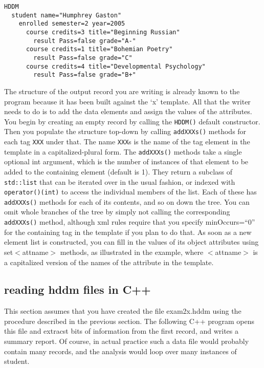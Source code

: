 \documentclass{revtex4}
\begin{document}
\vspace{0.5cm}
\begin{minipage}{12cm}
\begin{verbatim}
HDDM
  student name="Humphrey Gaston"
    enrolled semester=2 year=2005
      course credits=3 title="Beginning Russian"
        result Pass=false grade="A-"
      course credits=1 title="Bohemian Poetry"
        result Pass=false grade="C"
      course credits=4 title="Developmental Psychology"
        result Pass=false grade="B+"
\end{verbatim}
\end{minipage}
\vspace{0.5cm}

The structure of the output record you are writing is already known to
the program because it has been built against the `x' template. All that
the writer needs to do is to add the data elements and assign the values of
the attributes. You begin by creating an empty record by calling the 
\texttt{HDDM()} default constructor. Then you populate the structure
top-{}down by calling \texttt{addXXXs()} methods for each tag \texttt{XXX}
under that. The name \texttt{XXX}s is the name of the tag element in the
template in a capitalized-{}plural form. The \texttt{addXXXs()} methods
take a single optional int argument, which is the number of instances of
that element to be added to the containing element (default is 1). They
return a subclass of \texttt{std::list} that can be iterated over in the
usual fashion, or indexed with \texttt{operator()(int)} to access the
individual members of the list. Each of these has \texttt{addXXXs()}
methods for each of its contents, and so on down the tree. You can omit
whole branches of the tree by simply not calling the corresponding
\texttt{addXXXs()} method, although xml rules require that you specify
minOccurs=``0'' for the containing tag in the template if you plan to do
that. As soon as a new element list is constructed, you can fill in the
values of its object attributes using set{\mbox{$<$}}attname{\mbox{$>$}}
methods, as illustrated in the example, where {\mbox{$<$}}attname{\mbox{$>$}}
is a capitalized version of the names of the attribute in the template.

\subsection{reading hddm files in C++}

This section assumes that you have created the file exam2x.hddm using the
procedure described in the previous section. The following C++ program 
opens this file and extracst bits of information from the first record,
and writes a summary report. Of course, in actual practice such a data
file would probably contain many records, and the analysis would loop
over many instances of student.
\end{document}
